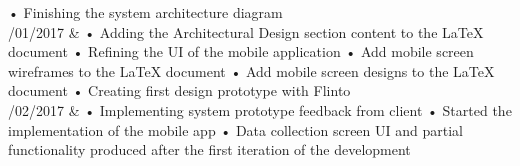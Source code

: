 \begin{longtabu}
        • Finishing the system architecture diagram
    \\ /01/2017
      & 
        • Adding the Architectural Design section content to the LaTeX document\newline
        • Refining the UI of the mobile application\newline
        • Add mobile screen wireframes to the LaTeX document\newline
        • Add mobile screen designs to the LaTeX document\newline
        • Creating first design prototype with Flinto 
    \\ /02/2017
      & 
        • Implementing system prototype feedback from client\newline
        • Started the implementation of the mobile app\newline
        • Data collection screen UI and partial functionality produced after the first iteration of the development
    \\ \hline
    \caption{Project Log}
    \label{table:project-log}
\end{longtabu}